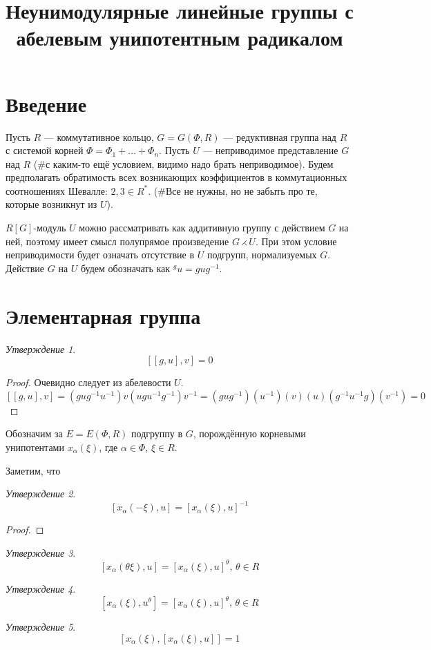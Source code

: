 \documentclass[15pt]{article}
\title{Неунимодулярные линейные группы с абелевым унипотентным радикалом}
\author{}
\date{}
\theoremstyle{remark}
\newtheorem{prop}{Утверждение}
\begin{document}
\maketitle

\sloppy

\section{Введение}

Пусть $R$ --- коммутативное кольцо, $G = G(\Phi, R)$ --- редуктивная группа над $R$ с системой корней $\Phi = \Phi_1 + \dots + \Phi_n$.
Пусть $U$ --- неприводимое представление $G$ над $R$ (\#с каким-то ещё условием, видимо надо брать неприводимое).
Будем предполагать обратимость всех возникающих коэффициентов в коммутационных соотношениях Шевалле: $2,3 \in R^* $.
(\#Все не нужны, но не забыть про те, которые возникнут из $U$).

$R[G]$-модуль $U$ можно рассматривать как аддитивную группу с действием $G$ на ней, поэтому
имеет смысл полупрямое произведение $G \rightthreetimes U$.
При этом условие неприводимости будет означать отсутствие в $U$ подгрупп, нормализуемых $G$.
Действие $G$ на $U$ будем обозначать как $^{g}u = g u g^{-1}$.

\section{Элементарная группа}

\begin{prop}
  $$[[g,u],v] = 0$$
\end{prop}
\begin{proof}
  Очевидно следует из абелевости $U$.
  $$ [[g,u],v] = (g u g^{-1} u^{-1}) v (u g u^{-1} g^{-1}) v^{-1} = (gug^{-1}) (u^{-1}) (v) (u) (g^{-1}u^{-1}g) (v^{-1}) = 0$$
\end{proof}

Обозначим за $E = E(\Phi,R)$ подгруппу в $G$, порождённую корневыми унипотентами $x_\alpha(\xi)$, где $\alpha \in \Phi$, $\xi \in R$.

Заметим, что
\begin{prop}
  $$[x_\alpha(-\xi),u] = [x_\alpha(\xi),u]^{-1}$$
\end{prop}
\begin{proof}
  
\end{proof}


\begin{prop}
  $$[x_\alpha(\theta\xi),u] = [x_\alpha(\xi),u]^\theta, \, \theta \in R$$
\end{prop}
\begin{prop}
  $$[x_\alpha(\xi),u^\theta] = [x_\alpha(\xi),u]^\theta, \, \theta \in R$$
\end{prop}
\begin{prop}
  $$[x_\alpha(\xi),[x_\alpha(\xi),u]] = 1$$
\end{prop}
\end{document}
